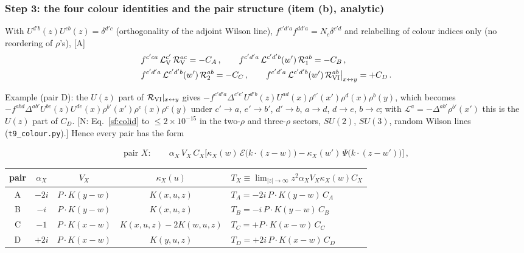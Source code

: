 \documentclass[10pt]{article}
\begin{document}
\subsubsection{Step 3: the four colour identities and the pair structure (item (b), analytic)}
\noindent With $U^{d'b}(z)U^{cb}(z)=\delta^{d'c}$ (orthogonality of the adjoint Wilson line), $f^{c'd'a}f^{dd'a}=N_{c}\delta^{c'd}$ and relabelling of colour indices only (no reordering of $\rho$'s), [A]
\begin{align}
&f^{c'ca}\,\mathcal{L}_{\rm V}^{c'}\,\mathcal{R}_{\rm V}^{ac}=-C_{A}\,,\qquad f^{c'd'a}\,\mathcal{L}^{c'd'b}(w')\,\mathcal{R}_{1}^{ab}=-C_{B}\,,\notag\\ &f^{c'd'a}\,\mathcal{L}^{c'd'b}(w')\,\mathcal{R}_{2}^{ab}=-C_{C}\,,\qquad f^{c'd'a}\,\mathcal{L}^{c'd'b}(w')\,\mathcal{R}_{\rm VI}^{ab}\big|_{x\leftrightarrow y}=+C_{D}\,.\label{sf:colid}
\end{align}
{\sloppy Example (pair D): the $U(z)$ part of $\mathcal{R}_{\rm VI}|_{x\leftrightarrow y}$ gives $-f^{c'd'a}\Delta^{c'e'}U^{d'b}(z)U^{ad}(x)\rho^{e'}(x')\rho^{d}(x)\rho^{b}(y)$, which becomes $-f^{abd}\Delta^{ab'}U^{bc}(z)U^{de}(x)\rho^{b'}(x')\rho^{e}(x)\rho^{c}(y)$ under $c'\to a$, $e'\to b'$, $d'\to b$, $a\to d$, $d\to e$, $b\to c$; with $\mathcal{L}^{a}=-\Delta^{ab'}\rho^{b'}(x')$ this is the $U(z)$ part of $C_{D}$. [N: Eq.~\eqref{sf:colid} to $\le2\times10^{-15}$ in the two-$\rho$ and three-$\rho$ sectors, $SU(2)$, $SU(3)$, random Wilson lines (\texttt{t9\_colour.py}).] Hence every pair has the form\par}
\begin{align}
\text{pair }X:\qquad \alpha_{X}\,V_{X}\,C_{X}\Big[\kappa_{X}(w)\,\mathcal{E}\big(k\cdot(z-w)\big)-\kappa_{X}(w')\,\Psi\big(k\cdot(z-w')\big)\Big]\,,\label{sf:pair}
\end{align}
\begin{center}
\renewcommand{\arraystretch}{1.3}
\begin{tabular}{|c|c|c|c|l|}\hline
pair & $\alpha_{X}$ & $V_{X}$ & $\kappa_{X}(u)$ & $T_{X}\equiv\lim_{|z|\to\infty} z^{2}\alpha_{X}V_{X}\kappa_{X}(w)C_{X}$\\\hline
A & $-2i$ & $P\cdot K(y-w)$ & $K(x,u,z)$ & $T_{A}=-2i\,P\!\cdot\!K(y-w)\,C_{A}$\\
B & $-i$ & $P\cdot K(y-w)$ & $K(x,u,z)$ & $T_{B}=-i\,P\!\cdot\!K(y-w)\,C_{B}$\\
C & $-1$ & $P\cdot K(x-w)$ & $K(x,u,z)-2K(w,u,z)$ & $T_{C}=+P\!\cdot\!K(x-w)\,C_{C}$\\
D & $+2i$ & $P\cdot K(x-w)$ & $K(y,u,z)$ & $T_{D}=+2i\,P\!\cdot\!K(x-w)\,C_{D}$\\\hline
\end{tabular}
\end{center}
\end{document}
